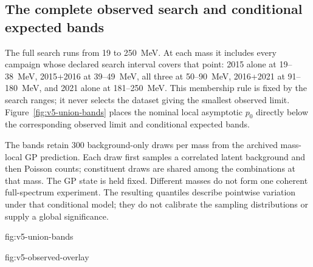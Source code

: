 \subsection{The complete observed search and conditional expected bands}
\label{sec:v5-band-results}

The full search runs from 19 to 250~MeV. At each mass it includes every campaign
whose declared search interval covers that point: 2015 alone at 19--38~MeV,
2015+2016 at 39--49~MeV, all three at 50--90~MeV, 2016+2021 at 91--180~MeV,
and 2021 alone at 181--250~MeV. This membership rule is fixed by the search
ranges; it never selects the dataset giving the smallest observed limit.
Figure~\ref{fig:v5-union-bands} places the nominal local asymptotic $p_0$ directly
below the corresponding observed limit and conditional expected bands.

The bands retain 300 background-only draws per mass from the archived
mass-local GP prediction. Each draw first samples a correlated latent
background and then Poisson counts; constituent draws are shared among the
combinations at that mass. The GP state is held fixed. Different masses do not
form one coherent full-spectrum experiment. The resulting quantiles describe
pointwise variation under that conditional model; they do not calibrate the
\CLs{} sampling distributions or supply a global significance.

{fig:v5-union-bands}

{fig:v5-observed-overlay}

\FloatBarrier
